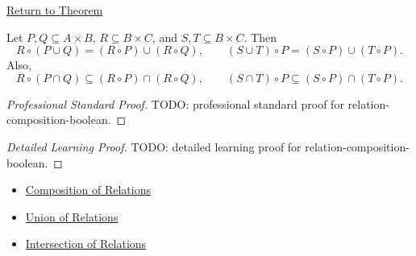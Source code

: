 \newpage
{}
\label{prf:relation-composition-boolean}

\begin{remark*}[Return]
\hyperref[thm:relation-composition-boolean]{Return to Theorem}
\end{remark*}

\begin{theorem*}
Let $P,Q\subseteq A\times B$, $R\subseteq B\times C$, and
$S,T\subseteq B\times C$. Then
\[
R\circ(P\cup Q)=(R\circ P)\cup(R\circ Q),
\qquad
(S\cup T)\circ P=(S\circ P)\cup(T\circ P).
\]
Also,
\[
R\circ(P\cap Q)\subseteq(R\circ P)\cap(R\circ Q),
\qquad
(S\cap T)\circ P\subseteq(S\circ P)\cap(T\circ P).
\]
\end{theorem*}

\begin{proof}[Professional Standard Proof]
\LRAProofBodyStart
TODO: professional standard proof for relation-composition-boolean.
\end{proof}

\begin{proof}[Detailed Learning Proof]
\LRAProofBodyStart
TODO: detailed learning proof for relation-composition-boolean.
\end{proof}

\begin{remark*}

\end{remark*}

\begin{dependencies}
\begin{itemize}
  \item \hyperref[def:relation-composition]{Composition of Relations}
  \item \hyperref[def:relation-union]{Union of Relations}
  \item \hyperref[def:relation-intersection]{Intersection of Relations}
\end{itemize}
\end{dependencies}

\clearpage
